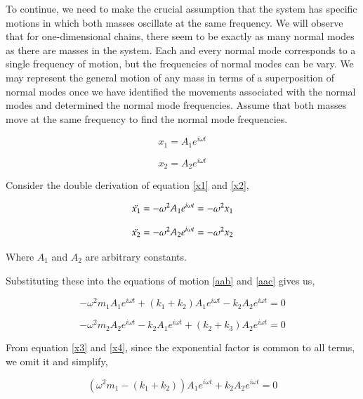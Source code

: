 To continue, we need to make the crucial assumption that the system has specific motions in which both masses oscillate at the same frequency. We will observe that for one-dimensional chains, there seem to be exactly as many normal modes as there are masses in the system. Each and every normal mode corresponds to a single frequency of motion, but the frequencies of normal modes can be vary. We may represent the general motion of any mass in terms of a superposition of normal modes once we have identified the movements associated with the normal modes and determined the normal mode frequencies. Assume that both masses move at the same frequency to find the normal mode frequencies.

\begin{equation}
\label{x1}
    x_1 = A_1e^{i\omega t}
\end{equation}

\begin{equation}
\label{x2}
    x_2 = A_2e^{i\omega t}
\end{equation}

Consider the double derivation of equation \eqref{x1} and \eqref{x2},

\begin{equation}
\label{x1}
    \Ddot{x_1}  = - \omega^2 A_1e^{i\omega t} = -\omega^2 x_1
\end{equation}

\begin{equation}
\label{x2}
   \Ddot{x_2}  = - \omega^2 A_2e^{i\omega t} = -\omega^2 x_2
\end{equation}
 
Where $A_1$ and $A_2$ are arbitrary constants.
 
Substituting these into the equations of motion \eqref{aab} and \eqref{aac}  gives us,

\begin{equation}
\label{x3}
    -\omega^2 m_1 A_1e^{i\omega t} +(k_1 + k_2) A_1e^{i\omega t}- k_2A_2e^{i\omega t}= 0
\end{equation}

\begin{equation}
    \label{x4}
    -\omega^2 m_2 A_2e^{i\omega t} - k_2 A_1 e^{i\omega t} + (k_2 + k_3)A_2e^{i\omega t} = 0 
\end{equation}

From equation \eqref{x3} and \eqref{x4}, since the exponential factor is common to all terms, we omit it and simplify, 

\begin{equation}
\label{x5}
    (\omega^2 m_1  -(k_1 + k_2)) A_1e^{i\omega t}+ k_2A_2e^{i\omega t}= 0
\end{equation}

